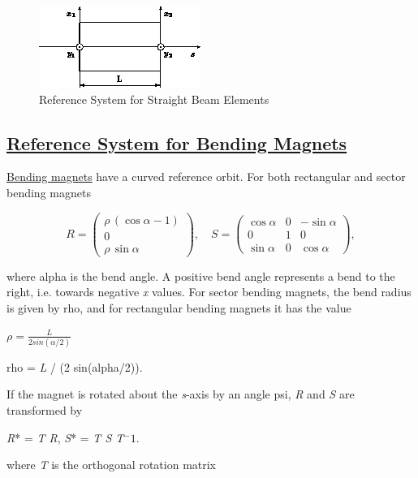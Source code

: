 \begin{figure}[H]
  \centering
	\includegraphics{figures/ref_straight.png}
  \caption{Reference System for Straight Beam Elements}
\end{figure}



\subsection{\href{rbend}{Reference System for Bending Magnets}}
\href{bend.html}{Bending magnets} have a curved reference orbit. For
both rectangular and sector bending magnets  


\[
R =
 \begin{pmatrix}
  \rho\,(\cos \alpha - 1) \\
  0 \\
  \rho\,\sin \alpha
 \end{pmatrix}
, \quad
S =
 \begin{pmatrix}
  \cos \alpha & 0 &  -\sin \alpha \\
  0 & 1 &  0 \\
  \sin \alpha & 0 &  \cos \alpha
 \end{pmatrix}
,
\]

where alpha is the bend angle. A positive bend angle represents a bend
to the right, i.e. towards negative \textit{x} values. For sector
bending magnets, the bend radius is given by rho, and for rectangular
bending magnets it has the value  

\( \rho = \frac{L}{2 sin(\alpha/2)} \)

 rho = \textit{L} / (2 sin(alpha/2)). 

If the magnet is rotated about the \textit{s}-axis by an angle psi,
\textit{R} and \textit{S} are transformed by  

\textit{R}* = \textit{T R}, \textit{S}* = \textit{T S T$^-1$}. 

where \textit{T} is the orthogonal rotation matrix 


